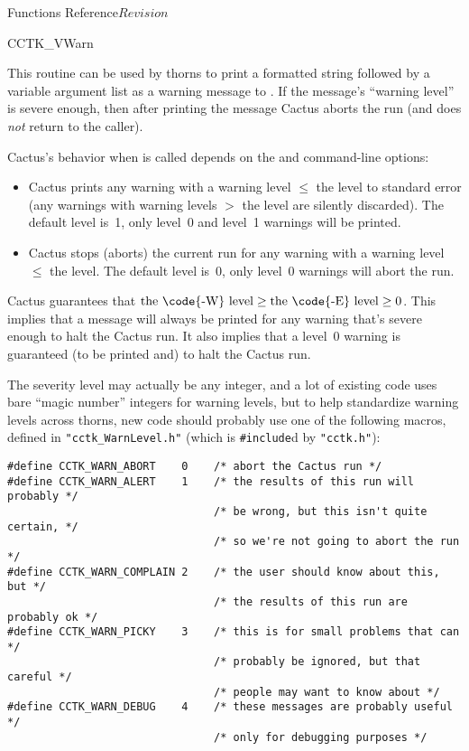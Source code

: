 \begin{cactuspart}{ Functions Reference}{}{$Revision$}
\begin{FunctionDescription}{CCTK\_VWarn}
\begin{Discussion}
This routine can be used by thorns to print a formatted string followed
by a variable argument list as a warning message to .  If
the message's ``warning level'' is severe enough, then after printing
the message Cactus aborts the run (and  does {\em not\/}
return to the caller).

Cactus's behavior when  is called depends on the
 and  command-line options:
\begin{itemize}
\item   Cactus prints any warning with a warning level $\le$
        the  level to standard error (any warnings with
        warning levels $>$ the  level are silently discarded).
        The default  level is~1, \ie{} only level~0 and level~1
        warnings will be printed.
\item   Cactus stops (aborts) the current run for any warning
        with a warning level $\le$ the  level.
        The default  level is~0, \ie{} only level~0
        warnings will abort the run.
\end{itemize}

Cactus guarantees that
$\mbox{the \code{-W}~level} \ge \mbox{the \code{-E}~level} \ge 0$.
This implies that a message will always be printed for any warning that's
severe enough to halt the Cactus run.  It also implies that a level~0
warning is guaranteed (to be printed and) to halt the Cactus run.

The severity level may actually be any integer, and a lot of existing
code uses bare ``magic number'' integers for warning levels, but to
help standardize warning levels across thorns, new code should probably
use one of the following macros, defined in \verb|"cctk_WarnLevel.h"|
(which is \verb|#include|d by \verb|"cctk.h"|):
\begin{verbatim}
#define CCTK_WARN_ABORT    0    /* abort the Cactus run */
#define CCTK_WARN_ALERT    1    /* the results of this run will probably */
                                /* be wrong, but this isn't quite certain, */
                                /* so we're not going to abort the run */
#define CCTK_WARN_COMPLAIN 2    /* the user should know about this, but */
                                /* the results of this run are probably ok */
#define CCTK_WARN_PICKY    3    /* this is for small problems that can */
                                /* probably be ignored, but that careful */
                                /* people may want to know about */
#define CCTK_WARN_DEBUG    4    /* these messages are probably useful */
                                /* only for debugging purposes */
\end{verbatim}


\end{Discussion}
\end{FunctionDescription}
\end{cactuspart}
